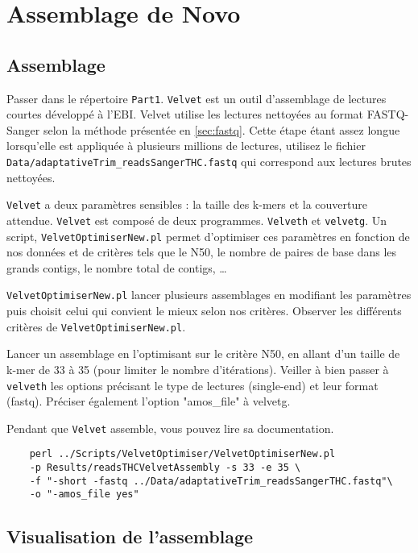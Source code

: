 \documentclass[a4paper,12pt]{article}
\begin{document}
\section{Assemblage de Novo}
\label{sec:assd}
\subsection{Assemblage}
Passer dans le répertoire \verb=Part1=. \verb=Velvet= est un outil d'assemblage de lectures courtes développé à l'EBI. Velvet utilise les lectures nettoyées au format FASTQ-Sanger selon la méthode présentée en \ref{sec:fastq}. Cette étape étant assez longue lorsqu'elle est appliquée à plusieurs millions de lectures, utilisez le fichier \verb=Data/adaptativeTrim_readsSangerTHC.fastq= qui correspond aux lectures brutes nettoyées.

\verb=Velvet= a deux paramètres sensibles : la taille des k-mers et la couverture attendue. \verb=Velvet= est composé de deux programmes. \verb=Velveth= et \verb=velvetg=.
Un script, \verb=VelvetOptimiserNew.pl= permet d'optimiser ces paramètres en fonction de nos données et de critères tels que le N50, le nombre de paires de base dans les grands contigs, le nombre total de contigs, \ldots

\verb=VelvetOptimiserNew.pl= lancer plusieurs assemblages en modifiant les paramètres puis choisit celui qui convient le mieux selon nos critères.
Observer les différents critères de \verb=VelvetOptimiserNew.pl=.

Lancer un assemblage en l'optimisant sur le critère N50, en allant d'un taille de k-mer de 33 à 35 (pour limiter le nombre d'itérations). Veiller à bien passer à \verb=velveth= les options précisant le type de lectures (single-end) et leur format (fastq). Préciser également l'option "amos\_file" à velvetg.

Pendant que \verb=Velvet= assemble, vous pouvez lire sa documentation.


\begin{lstlisting}	
	perl ../Scripts/VelvetOptimiser/VelvetOptimiserNew.pl 
	-p Results/readsTHCVelvetAssembly -s 33 -e 35 \
	-f "-short -fastq ../Data/adaptativeTrim_readsSangerTHC.fastq"\
	-o "-amos_file yes"
\end{lstlisting}	


\subsection{Visualisation de l'assemblage}
\end{document}
